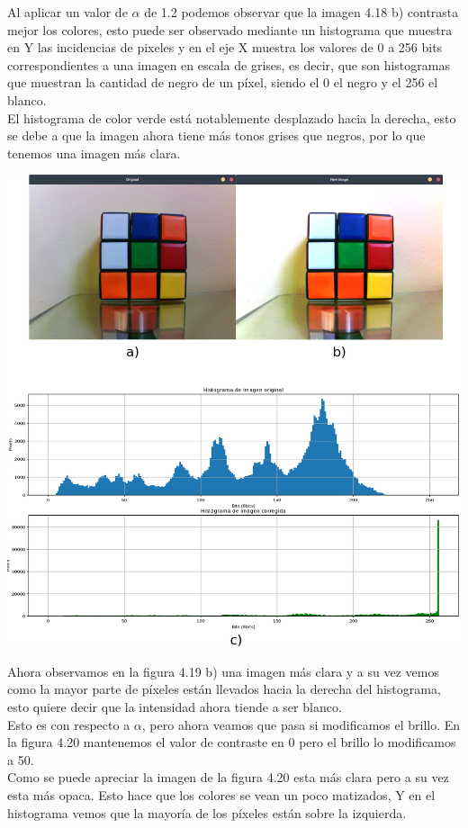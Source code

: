 Al aplicar un valor de $\alpha$ de 1.2 podemos observar que la imagen 4.18 b) contrasta mejor los colores, esto puede ser observado
mediante un histograma que muestra en Y las incidencias de pixeles y en el eje X muestra los valores de 0 a 256 bits correspondientes
a una imagen en escala de grises, es decir, que son histogramas que muestran la cantidad de negro de un píxel, siendo el 0 el negro
y el 256 el blanco.\\
El histograma de color verde está notablemente desplazado hacia la derecha, esto se debe a que la imagen ahora tiene más tonos grises
que negros, por lo que tenemos una imagen más clara.
\begin{center}
	\includegraphics[width=0.7 \textwidth]{Contenido/Cuerpo/Capitulo4/Fig20.eps}
	\label{Fig9}
\end{center}
Ahora observamos en la figura 4.19 b) una imagen más clara y a su vez vemos como la mayor parte de píxeles están llevados hacia la derecha del
histograma, esto quiere decir que la intensidad ahora tiende a ser blanco.\\
Esto es con respecto a $\alpha$, pero ahora veamos que pasa si modificamos el brillo. En la figura 4.20 mantenemos
el valor de contraste en 0 pero el brillo lo modificamos a 50.\\
Como se puede apreciar la imagen de la figura 4.20 esta más clara pero a su vez esta más opaca. Esto hace que los colores se vean un poco matizados,
Y en el histograma vemos que la mayoría de los píxeles están sobre la izquierda.
